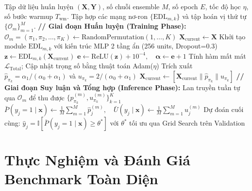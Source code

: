 \documentclass[1p,times]{elsarticle}
\begin{document}
\begin{algorithm}[htbp]
\caption{Quy trình Huấn luyện và Suy luận của EDL-ECC}
\label{alg:edl_ecc_full}
\small
\begin{algorithmic}[1]
\Require Tập dữ liệu huấn luyện $(\mathbf{X}, \mathbf{Y})$, số chuỗi ensemble $M$, số epoch $E$, tốc độ học $\eta$, số bước warmup $T_{\text{wm}}$.
\Ensure Tập hợp các mạng nơ-ron $\{\text{EDL}_{m,k}\}$ và tập hoán vị thứ tự $\{\mathcal{O}_m\}_{m=1}^M$.
\Statex \textbf{// Giai đoạn Huấn luyện (Training Phase):}
    \State $\mathcal{O}_m = (\pi_1, \pi_2, \dots, \pi_K) \leftarrow \text{RandomPermutation}(1, \dots, K)$
    \State $\mathbf{X}_{\text{current}} \leftarrow \mathbf{X}$
        \State Khởi tạo module $\text{EDL}_{m,k}$ với kiến trúc MLP 2 tầng ẩn (256 units, Dropout=0.3)
            \State $\mathbf{z} \leftarrow \text{EDL}_{m,k}(\mathbf{X}_{\text{current}})$
            \State $\mathbf{e} \leftarrow \text{ReLU}(\mathbf{z}) + 10^{-4}, \quad \boldsymbol{\alpha} \leftarrow \mathbf{e} + 1$
            \State Tính hàm mất mát $\mathcal{L}_{\text{Total}}$; Cập nhật trọng số bằng thuật toán Adam($\eta$)
        \EndFor
        \State Trích xuất $\hat{p}_{\pi_k} = \alpha_1 / (\alpha_0 + \alpha_1)$ và $u_{\pi_k} = 2 / (\alpha_0 + \alpha_1)$
        \State $\mathbf{X}_{\text{current}} \leftarrow [\mathbf{X}_{\text{current}} \parallel \hat{p}_{\pi_k} \parallel u_{\pi_k}]$ 
    \EndFor
\EndFor
\Statex \textbf{// Giai đoạn Suy luận và Tổng hợp (Inference Phase):}
        \State Lan truyền tuần tự qua $\mathcal{O}_m$ để thu được $\{\hat{p}_{\pi_k}^{(m)}, u_{\pi_k}^{(m)}\}_{k=1}^K$
    \EndFor
    \State $\bar{P}(y_j = 1 \mid \mathbf{x}) \leftarrow \frac{1}{M} \sum_{m=1}^M \hat{p}_j^{(m)}, \quad \bar{U}(y_j \mid \mathbf{x}) \leftarrow \frac{1}{M} \sum_{m=1}^M u_j^{(m)}$
    \State Dự đoán cuối cùng: $\hat{y}_j = \mathbb{I}\left[\bar{P}(y_j = 1 \mid \mathbf{x}) \ge \theta^*\right]$ với $\theta^*$ tối ưu qua Grid Search trên Validation
\EndFor
\end{algorithmic}
\end{algorithm}

\section{Thực Nghiệm và Đánh Giá Benchmark Toàn Diện}
\label{sec:experiments}
\end{document}
